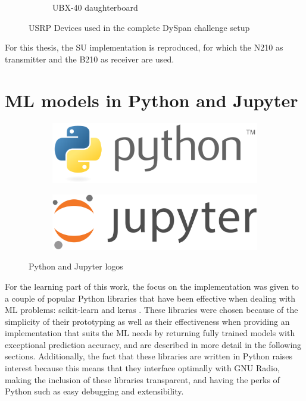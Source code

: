 \begin{figure}[htb]
\begin{subfigure}[htb]{0.4\textwidth}
        \caption{UBX-40 daughterboard\cite{UBX}}
        \label{fig:UBX}
    \end{subfigure}
    \caption{\ac{USRP} Devices used in the complete DySpan challenge setup}
    \label{fig:ettus}
\end{figure}

For this thesis, the \ac{SU} implementation is reproduced, for which the N210 as transmitter and the B210 as receiver are used.

\section{\ac{ML} models in Python and Jupyter}
\begin{figure}[!h]
    \centering
    \begin{subfigure}[htb]{0.45\textwidth}
        \centering
        \includegraphics[width=\linewidth]{figures/python_logo}
        \label{fig:python}
    \end{subfigure}
    \begin{subfigure}[htb]{0.45\textwidth}
        \centering
        \includegraphics[width=\linewidth]{figures/jupyter_logo}
        \label{fig:jupyter}
    \end{subfigure}
    \caption{Python and Jupyter logos}
    \label{fig:python_jupyter}
\end{figure}
For the learning part of this work, the focus on the implementation was given to a couple of popular Python libraries that have been effective when dealing with \ac{ML} problems: scikit-learn \cite{SKLEARN} and keras \cite{KERAS}. These libraries were chosen because of the simplicity of their prototyping as well as their effectiveness when providing an implementation that suits the \ac{ML} needs by returning fully trained models with exceptional prediction accuracy, and are described in more detail in the following sections. Additionally, the fact that these libraries are written in Python raises interest because this means that they interface optimally with GNU Radio, making the inclusion of these libraries transparent, and having the perks of Python such as easy debugging and extensibility.\\

